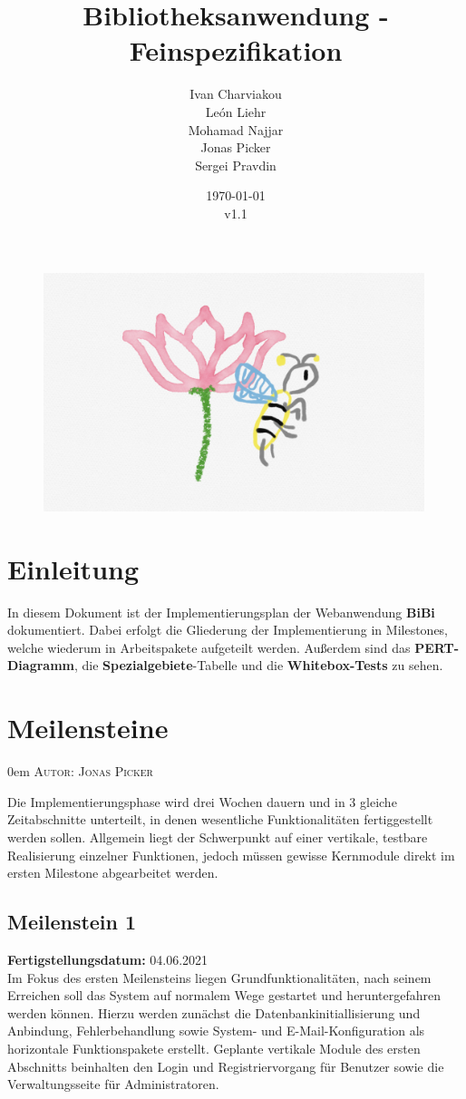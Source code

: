 \documentclass{article}
\title{Bibliotheksanwendung - Feinspezifikation}
\date{\today\\v1.1}
\author{
	Ivan Charviakou\\
	León Liehr\\
	Mohamad Najjar\\
	Jonas Picker\\
	Sergei Pravdin
}
\makeatletter
\newcommand{\sectionauthor}[1]{
	{\parindent 0em \large \scshape Autor: #1 \par \nobreak \vspace*{1em}}
	\@afterheading
}
\makeatother
\begin{document}
\maketitle
\begin{figure}[H]
	\centering
	\includegraphics[width = 30em]{Logo}
\end{figure}
\newpage
\tableofcontents
\newpage

\section{Einleitung}
In diesem Dokument ist der Implementierungsplan der Webanwendung \textbf{BiBi} dokumentiert. Dabei  erfolgt die Gliederung der Implementierung in Milestones, welche wiederum in Arbeitspakete aufgeteilt werden. Außerdem sind das \textbf{PERT-Diagramm},   die \textbf{Spezialgebiete}-Tabelle und die \textbf{Whitebox-Tests} zu sehen.

\section{Meilensteine}
\sectionauthor{Jonas Picker}
Die Implementierungsphase wird drei Wochen dauern und in 3 gleiche Zeitabschnitte unterteilt, in denen wesentliche Funktionalitäten fertiggestellt werden sollen. Allgemein liegt der Schwerpunkt auf einer vertikale, testbare Realisierung einzelner Funktionen, jedoch müssen gewisse Kernmodule direkt im ersten Milestone abgearbeitet werden. 
\subsection{Meilenstein 1}
\textbf{Fertigstellungsdatum:} 04.06.2021 \\
Im Fokus des ersten Meilensteins liegen Grundfunktionalitäten, nach seinem Erreichen soll das System auf normalem Wege gestartet und heruntergefahren werden können. Hierzu werden zunächst die Datenbankinitiallisierung und Anbindung, Fehlerbehandlung sowie System- und E-Mail-Konfiguration als horizontale Funktionspakete erstellt. Geplante vertikale Module des ersten Abschnitts beinhalten den Login und Registriervorgang für Benutzer sowie die Verwaltungsseite für Administratoren.
\end{document}
